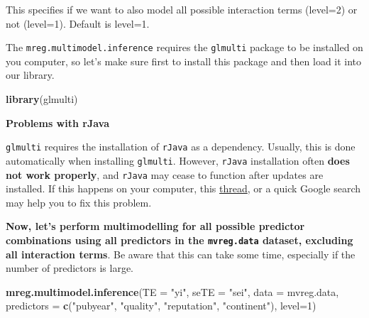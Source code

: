\documentclass[]{book}
\newenvironment{Shaded}{\begin{snugshade}}{\end{snugshade}}
\newcommand{\DataTypeTok}[1]{\textcolor[rgb]{0.13,0.29,0.53}{#1}}
\newcommand{\DecValTok}[1]{\textcolor[rgb]{0.00,0.00,0.81}{#1}}
\newcommand{\KeywordTok}[1]{\textcolor[rgb]{0.13,0.29,0.53}{\textbf{#1}}}
\newcommand{\NormalTok}[1]{#1}
\newcommand{\StringTok}[1]{\textcolor[rgb]{0.31,0.60,0.02}{#1}}
\begin{document}
This specifies if we want to also model all possible interaction terms (level=2) or not (level=1). Default is level=1.

The \texttt{mreg.multimodel.inference} requires the \texttt{glmulti} package to be installed on you computer, so let's make sure first to install this package and then load it into our library.

\begin{Shaded}
\begin{Highlighting}[]
\KeywordTok{library}\NormalTok{(glmulti)}
\end{Highlighting}
\end{Shaded}

\begin{rmdachtung}
\textbf{Problems with rJava}

\texttt{glmulti} requires the installation of \texttt{rJava} as a
dependency. Usually, this is done automatically when installing
\texttt{glmulti}. However, \texttt{rJava} installation often
\textbf{does not work properly}, and \texttt{rJava} may cease to
function after updates are installed. If this happens on your computer,
this
\href{https://stackoverflow.com/questions/6492361/problem-loading-rjava}{thread},
or a quick Google search may help you to fix this problem.
\end{rmdachtung}

\textbf{Now, let's perform multimodelling for all possible predictor combinations using all predictors in the \texttt{mvreg.data} dataset, excluding all interaction terms}. Be aware that this can take some time, especially if the number of predictors is large.

\begin{Shaded}
\begin{Highlighting}[]
\KeywordTok{mreg.multimodel.inference}\NormalTok{(}\DataTypeTok{TE =} \StringTok{"yi"}\NormalTok{, }
                          \DataTypeTok{seTE =} \StringTok{"sei"}\NormalTok{,}
                          \DataTypeTok{data =}\NormalTok{ mvreg.data,}
                          \DataTypeTok{predictors =} \KeywordTok{c}\NormalTok{(}\StringTok{"pubyear"}\NormalTok{, }\StringTok{"quality"}\NormalTok{, }\StringTok{"reputation"}\NormalTok{, }\StringTok{"continent"}\NormalTok{), }
                          \DataTypeTok{level=}\DecValTok{1}\NormalTok{)}
\end{Highlighting}
\end{Shaded}
\end{document}
